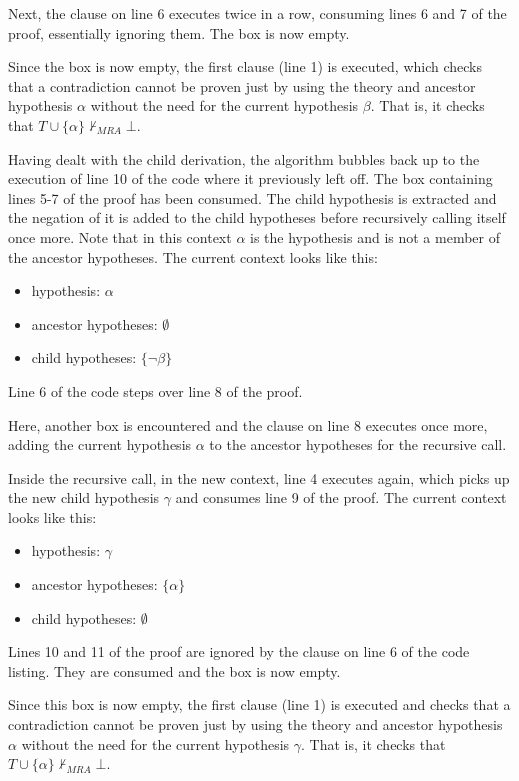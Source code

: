 \documentclass[11pt,twoside,a4paper]{report}
\begin{document}
Next, the clause on line 6 executes twice in a row, consuming lines 6 and 7 of the proof, essentially ignoring them. The box is now empty.

Since the box is now empty, the first clause (line 1) is executed, which checks that a contradiction cannot be proven just by using the theory and ancestor hypothesis $\alpha$ without the need for the current hypothesis $\beta$. That is, it checks that $T\cup\{\alpha\}\nvdash_{MRA}\bot$.

Having dealt with the child derivation, the algorithm bubbles back up to the execution of line 10 of the code where it previously left off. The box containing lines 5-7 of the proof has been consumed. The child hypothesis is extracted and the negation of it is added to the child hypotheses before recursively calling itself once more. Note that in this context $\alpha$ is the hypothesis and is not a member of the ancestor hypotheses. The current context looks like this:
\begin{itemize}
\item
hypothesis: $\alpha$
\item
ancestor hypotheses: $\emptyset$
\item
child hypotheses: $\{\neg\beta\}$
\end{itemize}

Line 6 of the code steps over line 8 of the proof.

Here, another box is encountered and the clause on line 8 executes once more, adding the current hypothesis $\alpha$ to the ancestor hypotheses for the recursive call.

Inside the recursive call, in the new context, line 4 executes again, which picks up the new child hypothesis $\gamma$ and consumes line 9 of the proof. The current context looks like this:
\begin{itemize}
\item
hypothesis: $\gamma$
\item
ancestor hypotheses: $\{\alpha\}$
\item
child hypotheses: $\emptyset$
\end{itemize}

Lines 10 and 11 of the proof are ignored by the clause on line 6 of the code listing. They are consumed and the box is now empty.

Since this box is now empty, the first clause (line 1) is executed and checks that a contradiction cannot be proven just by using the theory and ancestor hypothesis $\alpha$ without the need for the current hypothesis $\gamma$. That is, it checks that $T\cup\{\alpha\}\nvdash_{MRA}\bot$.
\end{document}
